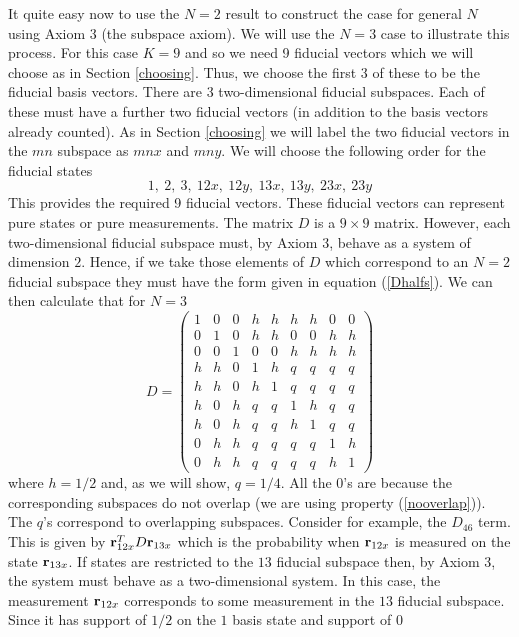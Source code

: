 \documentclass[12pt]{article}
\begin{document}
It quite easy now to use the $N=2$ result to construct the case for
general $N$ using Axiom 3 (the subspace axiom).  We will use the
$N=3$ case to illustrate this process.  For this case $K=9$ and so we
need 9 fiducial vectors which we will choose as in Section
\ref{choosing}.  Thus, we choose the first 3 of these
to be the fiducial basis vectors.
There are 3 two-dimensional fiducial
subspaces.  Each of these must have a further two fiducial vectors (in
addition to the basis vectors already counted).  As in Section
\ref{choosing} we will label the two
fiducial vectors in the $mn$ subspace as $mnx$ and $mny$.
We will choose the following order for the fiducial states
\[ 1,~ 2,~ 3,~ 12x,~ 12y,~ 13x,~ 13y,~ 23x,~ 23y    \]
This provides the required 9 fiducial vectors. These fiducial vectors
can represent pure states or pure measurements.  The matrix $D$ is a
$9\times 9$ matrix.  However, each two-dimensional fiducial subspace must, by
Axiom 3, behave as a system of dimension $2$.  Hence, if we take those
elements of $D$ which correspond to an $N=2$ fiducial subspace they must
have the form given in equation (\ref{Dhalfs}).  We can then calculate
that for $N=3$
\[ D= \left( \begin{array}{ccccccccc}
1 & 0 & 0 & h & h & h & h & 0 & 0 \\
0 & 1 & 0 & h & h & 0 & 0 & h & h \\
0 & 0 & 1 & 0 & 0 & h & h & h & h \\
h & h & 0 & 1 & h & q & q & q & q \\
h & h & 0 & h & 1 & q & q & q & q \\
h & 0 & h & q & q & 1 & h & q & q \\
h & 0 & h & q & q & h & 1 & q & q \\
0 & h & h & q & q & q & q & 1 & h \\
0 & h & h & q & q & q & q & h & 1
\end{array}\right)  \]
where $h=1/2$ and, as we will show, $q=1/4$.  All the 0's are because
the corresponding subspaces do not overlap (we are using property
(\ref{nooverlap})).  The $q$'s correspond to
overlapping subspaces.  Consider for example, the $D_{46}$ term.  This
is given by ${\bf r}_{12x}^T D {\bf r}_{13x}$ which is the probability
when ${\bf r}_{12x}$ is measured on the state ${\bf r}_{13x}$.  If
states are restricted to the $13$ fiducial subspace then, by Axiom 3,
the system must
behave as a two-dimensional system.  In this case, the measurement ${\bf
r}_{12x}$ corresponds to some measurement in the $13$ fiducial subspace.
Since it has support of $1/2$ on the $1$ basis state and support of $0$
\end{document}
